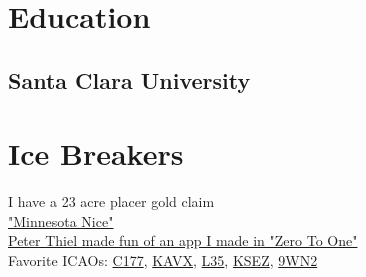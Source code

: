 \documentclass[]{plushcv}
\begin{document}
\begin{minipage}[t]{0.25\textwidth}


\section{Education} 
\subsection{Santa Clara University}

\section{Ice Breakers}
I have a 23 acre placer gold claim \\
\sectionsep
\href{https://www.youtube.com/watch?v=oiSzwoJr4-0}{"Minnesota Nice"} \\
\sectionsep
\href{https://books.google.com/books?id=Owc2nQEACAAJ&pg=PA75&source=gbs_selected_pages&cad=3#v=onepage&q=toilet+paper&f=false}{Peter Thiel made fun of an app I made in "Zero To One"} \\
\sectionsep
Favorite ICAOs: \href{https://romanch.uk/serve/images/c177-as-ksez}{C177}, \href{https://romanch.uk/serve/videos/avx-master-m3u8}{KAVX}, \href{https://romanch.uk/serve/videos/l35-master-m3u8}{L35}, \href{https://www.airnav.com/airport/KSEZ}{KSEZ}, \href{https://romanch.uk/serve/images/9wn2-airport}{9WN2}


\end{minipage} 
\end{document}
